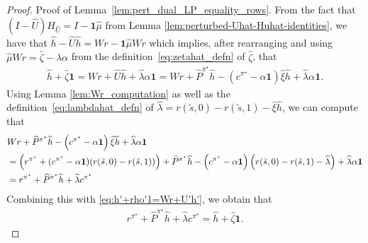 \documentclass[mnsc,nonblindrev]{informs3}
\newcommand{\Phat}{\widehat{P}}
\newcommand{\one}{\mathbf{1}}
\newcommand{\pistar}{\pi^\star}
\newcommand{\hhat}{\widehat{h}}
\newcommand{\muhat}{\widehat{\mu}}
\newcommand{\uhat}{\widehat{U}}
\newcommand{\xihat}{\widehat{\xi}}
\newcommand{\zetahat}{\widehat{\zeta}}
\newcommand{\lambdahat}{\widehat{\lambda}}
\begin{document}
\begin{APPENDICES}
\begin{proof}{Proof of Lemma~\ref{lem:pert_dual_LP_equality_rows}.}
From the fact that $(I - \uhat)H_{\uhat} = I - \one \muhat$ from Lemma \ref{lem:perturbed-Uhat-Huhat-identities}, we have that
$
    \hhat - \uhat \hhat = Wr - \one \muhat Wr \nonumber
$
which implies, after rearranging and using $\muhat W r = \zetahat - \lambdahat \alpha $ from the definition~\eqref{eq:zetahat_defn} of $\zetahat$, that
\begin{align}
    \hhat + \zetahat\one = Wr + \uhat \hhat + \lambdahat \alpha \one= Wr + \Phat^{\pistar} \hhat - \left(c^{\pistar} - \alpha \one\right)\xihat \hhat + \lambdahat \alpha \one. \label{eq:h'+rho'1=Wr+U'h'}
\end{align}
Using Lemma \ref{lem:Wr_computation} as well as the definition~\eqref{eq:lambdahat_defn} of $\lambdahat=r(\tilde{s},0) - r(\tilde{s},1) - \xihat \hhat$, we can compute that
\begin{align*}
    &Wr + \Phat^{\pistar} \hhat - \left(c^{\pistar} - \alpha \one\right)\xihat \hhat + \lambdahat \alpha \one\\
    &= \left(r^{\pistar} + (c^{\pistar} - \alpha \one)(r(\Tilde{s},0) - r(\Tilde{s},1)) \right) + \Phat^{\pistar} \hhat - \left(c^{\pistar} - \alpha \one\right)\left( r(\tilde{s},0) - r(\tilde{s},1) - \lambdahat\right) + \lambdahat \alpha \one \\
    &= r^{\pistar} + \Phat^{\pistar} \hhat + \lambdahat c^{\pistar}
\end{align*}
Combining this with \eqref{eq:h'+rho'1=Wr+U'h'}, we obtain that
\begin{align}
    r^{\pistar} + \Phat^{\pistar} \hhat + \lambdahat c^{\pistar}=\hhat+\zetahat\one. 
    \label{eq:pert_LP_bellman_eqn}
\end{align}


\end{proof}
\end{APPENDICES}
\end{document}
